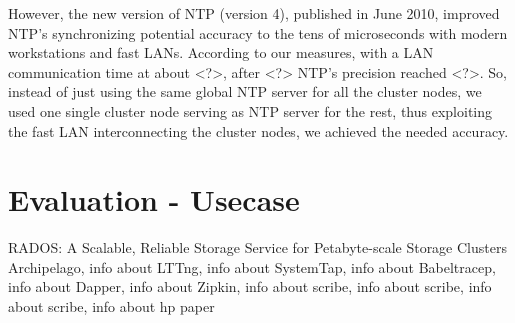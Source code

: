\documentclass[a4paper,10pt,twocolumn]{article}
\begin{document}
However, the new version of NTP (version 4), published in June 2010, improved
NTP's synchronizing potential accuracy to the tens of microseconds with modern
workstations and fast LANs. According to our measures, with a LAN communication
time at about <?>, after <?> NTP's precision reached <?>.  So, instead of just
using the same global NTP server for all the cluster nodes, we used one single
cluster node serving as NTP server for the rest, thus exploiting the fast LAN
interconnecting the cluster nodes, we achieved the needed accuracy.
 
\section{Evaluation - Usecase}

\begin{thebibliography}{9}
    RADOS: A Scalable, Reliable Storage Service for Petabyte-scale
    Storage Clusters
    Archipelago,
    info about
    LTTng,
    info about
    SystemTap,
    info about
    Babeltracep,
    info about
    Dapper,
    info about
    Zipkin,
   info about
    scribe,
   info about
    scribe,
   info about
    scribe,
   info about
    hp paper
\end{thebibliography}
\end{document}
